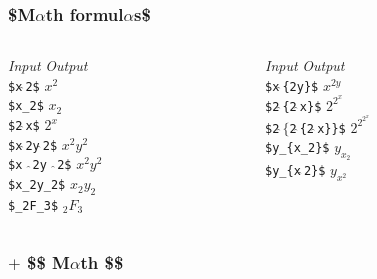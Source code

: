 \documentclass{beamer}
\begin{document}
\def\metahat{$\hat{\ }$}
\begin{frame}
	\frametitle{\$M$\alpha$th formul$\alpha$s\$}
	
	\begin{columns}
	
	\begin{column}{4cm}
	\begin{tabbing}
		{\em Input} \hspace{2.5cm} \= {\em Output} \\
		{\tt \$x\metahat 2\$} \> $x^2$\\
		{\tt \$x\_2\$} \> $x_2$\\
		{\tt \$2\metahat x\$} \> $2^x$\\
		{\tt \$x\metahat 2y\metahat 2\$} \> $x^2y^2$ \\
		{\tt \$x \metahat  2y \metahat  2\$} \> $x ^ 2y ^ 2$ \\
		{\tt \$x\_2y\_2\$} \> $x_2y_2$ \\
		{\tt \$\_2F\_3\$} \> $_2F_3$ \\
	\end{tabbing}
	\end{column}
	
        \begin{column}{4cm}
            \begin{tabbing}
		{\em Input} \hspace{2.3cm} \= {\em Output} \\
                {\tt \$x\metahat \{2y\}\$} \> $x^{2y}$ \\
                {\tt \$2\metahat \{2\metahat x\}\$} \> $2^{2^x}$ \\
                {\tt \$2$\hat{\ }\{$2\metahat \{2\metahat x\}\}\$} \> $2^{2^{2^x}}$ \\
                {\tt \$y\_\{x\_2\}\$} \> $y_{x_2}$ \\
                {\tt \$y\_\{x\metahat 2\}\$} \> $y_{x^2}$ \\
            \end{tabbing}        
        \end{column}
        
    \end{columns}	

\end{frame}

\begin{frame}
    \frametitle{$+$  \$\$ M$\alpha$th \$\$}
    

\end{frame}
\end{document}
